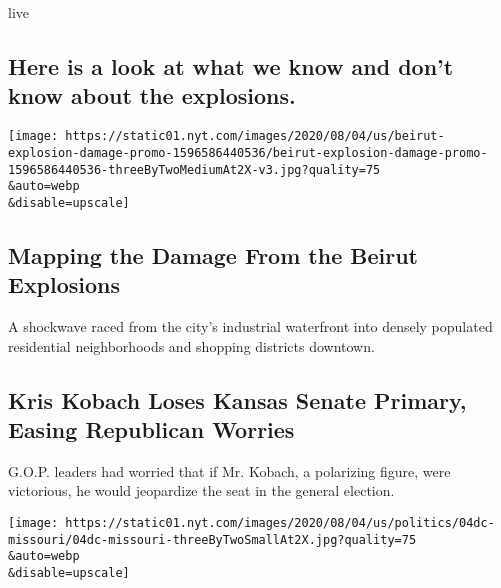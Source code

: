live

\href{/2020/08/05/world/middleeast/beirut-explosion-what-happened.html}{}

\hypertarget{here-is-a-look-at-what-we-know-and-dont-know-about-the-explosions}{%
\subsection{Here is a look at what we know and don't know about the
explosions.}\label{here-is-a-look-at-what-we-know-and-dont-know-about-the-explosions}}

\href{/interactive/2020/08/04/world/middleeast/beirut-explosion-damage.html}{}

\texttt{[image: https://static01.nyt.com/images/2020/08/04/us/beirut-explosion-damage-promo-1596586440536/beirut-explosion-damage-promo-1596586440536-threeByTwoMediumAt2X-v3.jpg?quality=75\\\&auto=webp\\\&disable=upscale]}

\href{/interactive/2020/08/04/world/middleeast/beirut-explosion-damage.html}{}

\hypertarget{mapping-the-damage-from-the-beirut-explosions}{%
\subsection{Mapping the Damage From the Beirut
Explosions}\label{mapping-the-damage-from-the-beirut-explosions}}

A shockwave raced from the city's industrial waterfront into densely
populated residential neighborhoods and shopping districts downtown.

\href{/2020/08/04/us/politics/kobach-tlaib.html}{}

\hypertarget{kris-kobach-loses-kansas-senate-primary-easing-republican-worries}{%
\subsection{Kris Kobach Loses Kansas Senate Primary, Easing Republican
Worries}\label{kris-kobach-loses-kansas-senate-primary-easing-republican-worries}}

G.O.P. leaders had worried that if Mr. Kobach, a polarizing figure, were
victorious, he would jeopardize the seat in the general election.

\href{/2020/08/05/us/politics/cori-bush-missouri-william-lacy-clay.html}{}

\texttt{[image: https://static01.nyt.com/images/2020/08/04/us/politics/04dc-missouri/04dc-missouri-threeByTwoSmallAt2X.jpg?quality=75\\\&auto=webp\\\&disable=upscale]}

